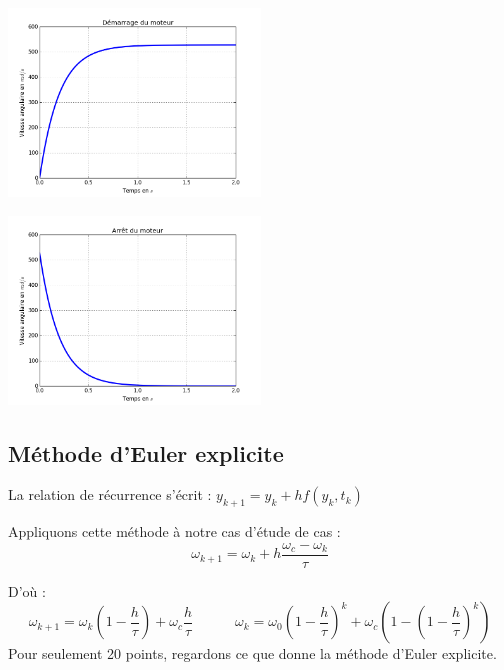 \documentclass[10pt]{article}
\begin{document}
\begin{minipage}[c]{.47\linewidth}
\begin{center}
\includegraphics[height=5cm]{images/fig_02_bis}
\end{center}
\end{minipage}
\hfill
\begin{minipage}[c]{.47\linewidth}
\begin{center}
\includegraphics[height=5cm]{images/fig_03_bis}
\end{center}
\end{minipage}

\subsection{Méthode d'Euler explicite}
\begin{resultat}
La relation de récurrence s’écrit : $y_{k+1}=y_k+hf(y_k,t_k)$
\end{resultat}

Appliquons cette méthode à notre cas d'étude de cas :
$$\omega_{k+1}=\omega_k+h \dfrac{\omega_c-\omega_k}{\tau}$$

D’où :
$$
\omega_{k+1}=\omega_k \left(1-\dfrac{h}{\tau}\right)+\omega_c \dfrac{h}{\tau}
\quad \quad \quad 
\omega_k=\omega_0 \left(1-\dfrac{h}{\tau}\right)^k+\omega_c\left(1-\left(1-\dfrac{h}{\tau}\right)^k \right)
$$
Pour seulement 20 points, regardons ce que donne la méthode d’Euler explicite.
\end{document}
